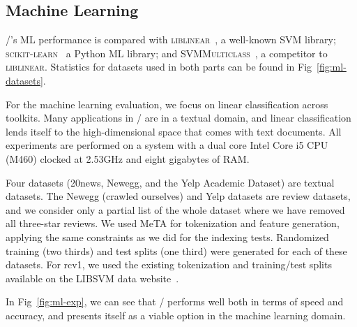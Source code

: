 






\subsection{Machine Learning}

\meta/'s ML performance is compared with \textsc{liblinear}~\cite{liblinear}, a
well-known SVM library; \textsc{scikit-learn}~\cite{scikit} a Python ML library;
and \textsc{SVMMulticlass}~\cite{svmmulticlass}, a competitor to
\textsc{liblinear}. Statistics for datasets used in both parts can be found in
Fig~\ref{fig:ml-datasets}.

For the machine learning evaluation, we focus on linear classification across
toolkits. Many applications in \meta/ are in a textual domain, and linear
classification lends itself to the high-dimensional space that comes with text
documents. All experiments are performed on a system with a dual core Intel Core
i5 CPU (M460) clocked at 2.53GHz and eight gigabytes of RAM.

Four datasets (20news\footnotemark[6], Newegg, and the Yelp Academic
Dataset\footnotemark[10]) are textual datasets. The Newegg (crawled ourselves)
and Yelp datasets are review datasets, and we consider only a partial list of
the whole dataset where we have removed all three-star reviews. We used MeTA for
tokenization and feature generation, applying the same constraints as we did for
the indexing tests. Randomized training (two thirds) and test splits (one third)
were generated for each of these datasets. For rcv1, we used the existing
tokenization and training/test splits available on the LIBSVM data
website~\footnotemark[11].


In Fig~\ref{fig:ml-exp}, we can see that \meta/ performs well both in
terms of speed and accuracy, and presents itself as a viable option in the
machine learning domain.




